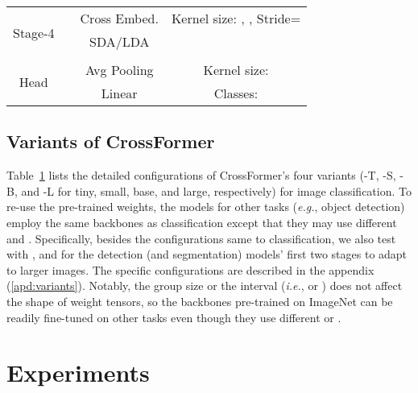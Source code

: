 \documentclass{article} \usepackage{iclr2022_conference,times}
\newcommand{\ie}{{\emph{i.e.}}}
\newcommand{\eg}{{\emph{e.g.}}}
\begin{document}
\begin{table}[]
{{\begin{tabular}{cc|c|cccc}
                \midrule
                \multirow{5}{*}{Stage-4} & \multirow{4}{*}{} & Cross Embed. & \multicolumn{4}{c}{Kernel size: , , Stride=} \\
                \cmidrule{3-7}
                & \multirow{4}{*}{} & \multirow{3}{*}{SDA/LDA} & \multirow{3}{*}{} & \multirow{2}{*}{} & \multirow{2}{*}{} & \multirow{2}{*}{} \\
                &  & \multirow{3}{*}{MLP} &  &  &  \\
                &  &  & & & & \\
                &  &  & & & & \\
                \midrule
                \multirow{2}{*}{Head} & \multirow{2}{*}{} & Avg Pooling & \multicolumn{4}{c}{Kernel size: } \\
                \cmidrule{3-7}
                &  & Linear & \multicolumn{4}{c}{Classes: } \\
                \bottomrule
    \end{tabular}}}
    \label{tab:variants}
       \vspace{-4mm}
\end{table}


\vspace{-2mm}
\subsection{Variants of CrossFormer}
\vspace{-1mm}

Table~\ref{tab:variants} lists the detailed configurations of CrossFormer's four variants (-T, -S, -B, and -L for tiny, small, base, and large, respectively) for image classification.
To re-use the pre-trained weights, the models for other tasks (\eg, object detection) employ the same backbones as classification except that they may use different  and . Specifically, besides the configurations same to classification, we also test with , and  for the detection (and segmentation) models' first two stages to adapt to larger images. The specific configurations are described in the appendix (\ref{apd:variants}).
Notably, the group size or the interval (\ie,  or ) does not affect the shape of weight tensors, so the backbones pre-trained on ImageNet can be readily fine-tuned on other tasks even though they use different  or .

\vspace{-2mm}
\section{Experiments}
\vspace{-1mm}
\end{document}
